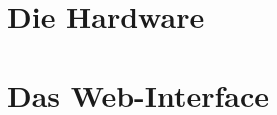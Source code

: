 \documentclass[paper=a4,12pt,pointlessnumbers,twoside]{scrreprt}
\begin{document}
\chapter{Die Hardware}


\chapter{Das Web-Interface}

\end{document}
